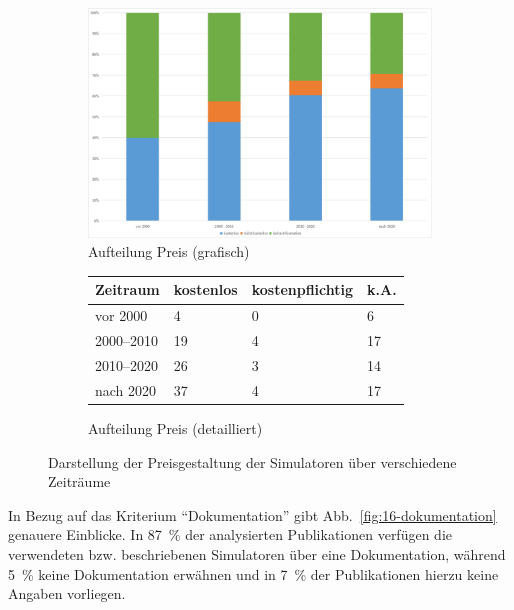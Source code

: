 \begin{figure}[!htbp]
    \centering
    \begin{subfigure}[b]{0.48\textwidth}
        \centering
        \includegraphics[width=\textwidth]{graphics/15-preis-jahr.png}
        \caption{Aufteilung Preis (grafisch)}
        \label{fig:15-preis-jahr}
    \end{subfigure}
    \hfill
    \begin{subfigure}[b]{0.48\textwidth}
        \centering
        \tiny
        \begin{tabularx}{\textwidth}{lXXX}
            \hline
            \textbf{Zeitraum} & \textbf{kostenlos} & \textbf{kostenpflichtig} & \textbf{k.A.} \\
            \hline
            vor 2000      & 4  & 0 & 6  \\
            2000--2010    & 19 & 4 & 17 \\
            2010--2020    & 26 & 3 & 14 \\
            nach 2020     & 37 & 4 & 17 \\
            \hline
        \end{tabularx}
        \caption{Aufteilung Preis (detailliert)}
        \label{tab:15-preis-zeit}
    \end{subfigure}
    \caption{Darstellung der Preisgestaltung der Simulatoren über verschiedene Zeiträume}
    \label{fig:15-preis-gesamt}
\end{figure}

In Bezug auf das Kriterium \enquote{Dokumentation} gibt Abb.~\ref{fig:16-dokumentation} genauere Einblicke. In 87~\% der analysierten Publikationen verfügen die verwendeten bzw. beschriebenen Simulatoren über eine Dokumentation, während 5~\% keine Dokumentation erwähnen und in 7~\% der Publikationen hierzu keine Angaben vorliegen.

